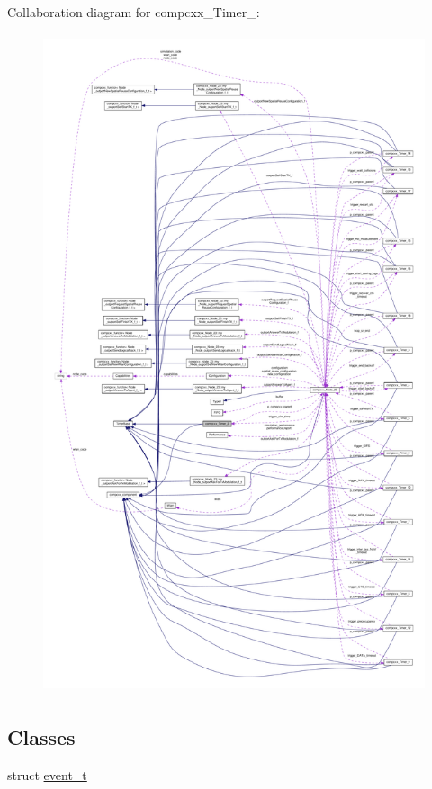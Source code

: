 Collaboration diagram for compcxx\+\_\+\+Timer\+\_\+:\nopagebreak
\begin{figure}[H]
\begin{center}
\leavevmode
\includegraphics[height=550pt]{classcompcxx__Timer__2__coll__graph}
\end{center}
\end{figure}
\subsection*{Classes}
\begin{DoxyCompactItemize}
\item 
struct \hyperlink{structcompcxx__Timer__2_1_1event__t}{event\+\_\+t}
\end{DoxyCompactItemize}
